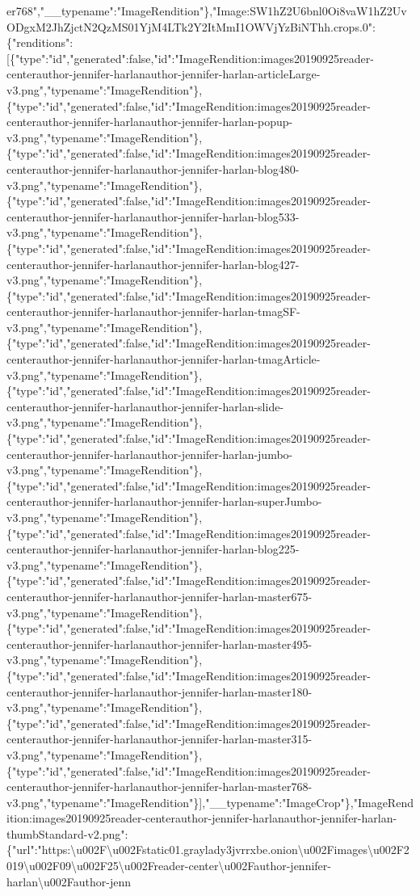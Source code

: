 er768","\_\_typename":"ImageRendition"\},"Image:SW1hZ2U6bnl0Oi8vaW1hZ2UvODgxM2JhZjctN2QzMS01YjM4LTk2Y2ItMmI1OWVjYzBiNThh.crops.0":\{"renditions":{[}\{"type":"id","generated":false,"id":"ImageRendition:images20190925reader-centerauthor-jennifer-harlanauthor-jennifer-harlan-articleLarge-v3.png","typename":"ImageRendition"\},\{"type":"id","generated":false,"id":"ImageRendition:images20190925reader-centerauthor-jennifer-harlanauthor-jennifer-harlan-popup-v3.png","typename":"ImageRendition"\},\{"type":"id","generated":false,"id":"ImageRendition:images20190925reader-centerauthor-jennifer-harlanauthor-jennifer-harlan-blog480-v3.png","typename":"ImageRendition"\},\{"type":"id","generated":false,"id":"ImageRendition:images20190925reader-centerauthor-jennifer-harlanauthor-jennifer-harlan-blog533-v3.png","typename":"ImageRendition"\},\{"type":"id","generated":false,"id":"ImageRendition:images20190925reader-centerauthor-jennifer-harlanauthor-jennifer-harlan-blog427-v3.png","typename":"ImageRendition"\},\{"type":"id","generated":false,"id":"ImageRendition:images20190925reader-centerauthor-jennifer-harlanauthor-jennifer-harlan-tmagSF-v3.png","typename":"ImageRendition"\},\{"type":"id","generated":false,"id":"ImageRendition:images20190925reader-centerauthor-jennifer-harlanauthor-jennifer-harlan-tmagArticle-v3.png","typename":"ImageRendition"\},\{"type":"id","generated":false,"id":"ImageRendition:images20190925reader-centerauthor-jennifer-harlanauthor-jennifer-harlan-slide-v3.png","typename":"ImageRendition"\},\{"type":"id","generated":false,"id":"ImageRendition:images20190925reader-centerauthor-jennifer-harlanauthor-jennifer-harlan-jumbo-v3.png","typename":"ImageRendition"\},\{"type":"id","generated":false,"id":"ImageRendition:images20190925reader-centerauthor-jennifer-harlanauthor-jennifer-harlan-superJumbo-v3.png","typename":"ImageRendition"\},\{"type":"id","generated":false,"id":"ImageRendition:images20190925reader-centerauthor-jennifer-harlanauthor-jennifer-harlan-blog225-v3.png","typename":"ImageRendition"\},\{"type":"id","generated":false,"id":"ImageRendition:images20190925reader-centerauthor-jennifer-harlanauthor-jennifer-harlan-master675-v3.png","typename":"ImageRendition"\},\{"type":"id","generated":false,"id":"ImageRendition:images20190925reader-centerauthor-jennifer-harlanauthor-jennifer-harlan-master495-v3.png","typename":"ImageRendition"\},\{"type":"id","generated":false,"id":"ImageRendition:images20190925reader-centerauthor-jennifer-harlanauthor-jennifer-harlan-master180-v3.png","typename":"ImageRendition"\},\{"type":"id","generated":false,"id":"ImageRendition:images20190925reader-centerauthor-jennifer-harlanauthor-jennifer-harlan-master315-v3.png","typename":"ImageRendition"\},\{"type":"id","generated":false,"id":"ImageRendition:images20190925reader-centerauthor-jennifer-harlanauthor-jennifer-harlan-master768-v3.png","typename":"ImageRendition"\}{]},"\_\_typename":"ImageCrop"\},"ImageRendition:images20190925reader-centerauthor-jennifer-harlanauthor-jennifer-harlan-thumbStandard-v2.png":\{"url":"https:\textbackslash{}u002F\textbackslash{}u002Fstatic01.graylady3jvrrxbe.onion\textbackslash{}u002Fimages\textbackslash{}u002F2019\textbackslash{}u002F09\textbackslash{}u002F25\textbackslash{}u002Freader-center\textbackslash{}u002Fauthor-jennifer-harlan\textbackslash{}u002Fauthor-jenn